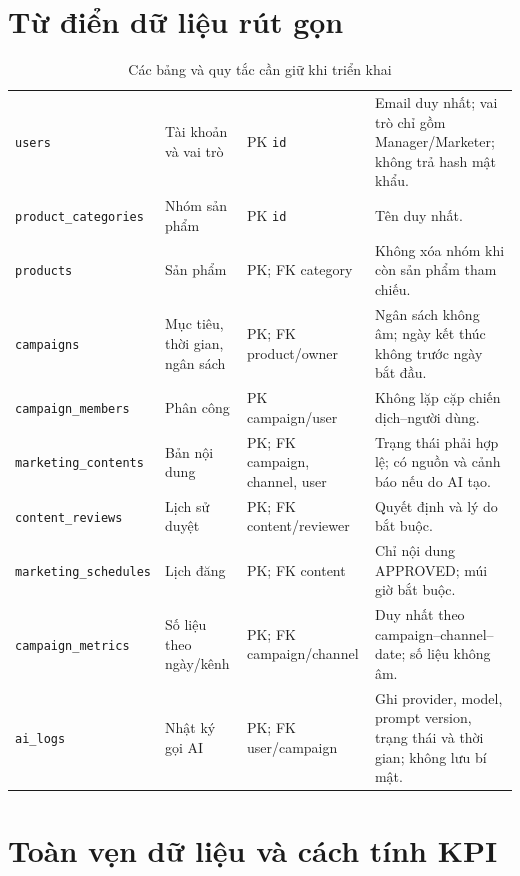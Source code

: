 \clearpage
\section{Từ điển dữ liệu rút gọn}

\begin{table}[!htbp]
\centering
\small
\caption{Các bảng và quy tắc cần giữ khi triển khai}\label{tab:v8-data-dictionary}
\begin{tabularx}{\textwidth}{|L{3.6cm}|L{2.5cm}|L{2.6cm}|Y|}
\hline
{} &  &  & \\
\hline
\texttt{users} & Tài khoản và vai trò & PK \texttt{id} & Email duy nhất; vai trò chỉ gồm Manager/Marketer; không trả hash mật khẩu.\\
\hline
\texttt{product\_categories} & Nhóm sản phẩm & PK \texttt{id} & Tên duy nhất.\\
\hline
\texttt{products} & Sản phẩm & PK; FK category & Không xóa nhóm khi còn sản phẩm tham chiếu.\\
\hline
\texttt{campaigns} & Mục tiêu, thời gian, ngân sách & PK; FK product/owner & Ngân sách không âm; ngày kết thúc không trước ngày bắt đầu.\\
\hline
\texttt{campaign\_members} & Phân công & PK campaign/user & Không lặp cặp chiến dịch--người dùng.\\
\hline
\texttt{marketing\_contents} & Bản nội dung & PK; FK campaign, channel, user & Trạng thái phải hợp lệ; có nguồn và cảnh báo nếu do AI tạo.\\
\hline
\texttt{content\_reviews} & Lịch sử duyệt & PK; FK content/reviewer & Quyết định và lý do bắt buộc.\\
\hline
\texttt{marketing\_schedules} & Lịch đăng & PK; FK content & Chỉ nội dung APPROVED; múi giờ bắt buộc.\\
\hline
\texttt{campaign\_metrics} & Số liệu theo ngày/kênh & PK; FK campaign/channel & Duy nhất theo campaign--channel--date; số liệu không âm.\\
\hline
\texttt{ai\_logs} & Nhật ký gọi AI & PK; FK user/campaign & Ghi provider, model, prompt version, trạng thái và thời gian; không lưu bí mật.\\
\hline
\end{tabularx}
\end{table}

\section{Toàn vẹn dữ liệu và cách tính KPI}

